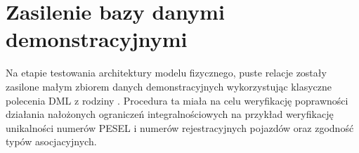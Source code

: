 \documentclass[a4paper,11pt,english,openany,oneside]{sphinxmanual}
\begin{document}
\begin{sphinxVerbatim}[commandchars=\\\{\}]


\end{sphinxVerbatim}


\section{Zasilenie bazy danymi demonstracyjnymi}
\label{\detokenize{rozdzial_4/index:zasilenie-bazy-danymi-demonstracyjnymi}}
\sphinxAtStartPar
Na etapie testowania architektury modelu fizycznego, puste relacje zostały zasilone małym zbiorem danych demonstracyjnych wykorzystując klasyczne polecenia DML z rodziny . Procedura ta miała na celu weryfikację poprawności działania nałożonych ograniczeń integralnościowych \textendash{} na przykład weryfikację unikalności numerów PESEL i numerów rejestracyjnych pojazdów oraz zgodność typów asocjacyjnych.
\end{document}
